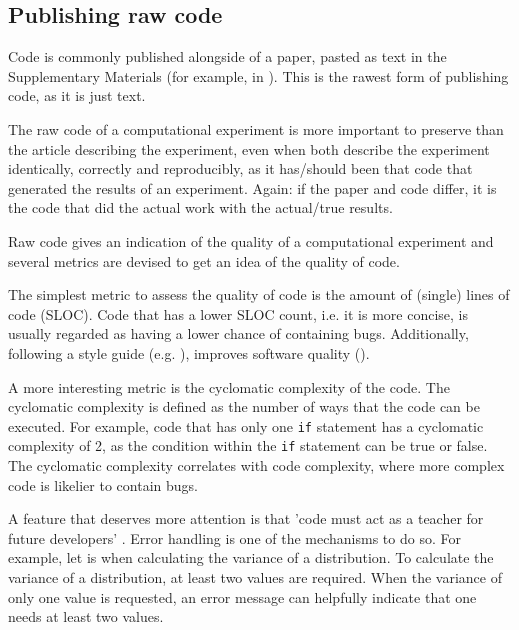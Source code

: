 \subsection{Publishing raw code}

Code is commonly published alongside of a 
paper, pasted as text in the Supplementary Materials 
(for example, in \cite{labrecque2019interpretation}).
This is the rawest form of publishing code,
as it is just text.


The raw code of a computational experiment is
more important to preserve than the article describing
the experiment, even when both describe the experiment identically,
correctly and reproducibly, 
as it has/should been that code that generated the results of an experiment.
Again: if the paper and code differ, it is the code that did
the actual work with the actual/true results.


Raw code gives an indication of the quality 
of a computational experiment and several metrics are
devised to get an idea of the quality of code.

The simplest metric to assess the quality of code is 
the amount of (single) lines of code (SLOC). 
Code that has a lower SLOC count, i.e. it is more concise,
is usually regarded as having a lower chance of containing bugs.
Additionally, following a style guide (e.g. \cite{style_guide}), 
improves software quality (\cite{fang2001}).

A more interesting metric is the cyclomatic complexity of the code.
The cyclomatic complexity is defined as the number of ways that
the code can be executed. 
For example, code that has only one \verb|if| statement
has a cyclomatic complexity of 2, as the condition within the \verb|if|
statement can be true or false.
The cyclomatic complexity correlates with code complexity,
where more complex code is likelier to contain bugs.

A feature that deserves more attention
is that 'code must act as a teacher for future developers' \cite{sadowski2018modern}.
Error handling is one of the mechanisms to do so.
For example, let is when calculating the variance of a distribution.
To calculate the variance of a distribution, at least two values
are required. When the variance of only one value is requested,
an error message can helpfully indicate that one needs at least two values.

